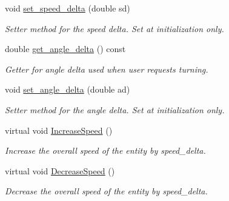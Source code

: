 \begin{DoxyCompactItemize}
void \mbox{\hyperlink{class_motion_handler_a908b330346b3fe969684106bd5c7619d}{set\+\_\+speed\+\_\+delta}} (double sd)
\begin{DoxyCompactList}\small\item\em Setter method for the speed delta. Set at initialization only. \end{DoxyCompactList}\item 
\mbox{\label{class_motion_handler_aa5ec33068c516234a6521de356b08d68}} 
double \mbox{\hyperlink{class_motion_handler_aa5ec33068c516234a6521de356b08d68}{get\+\_\+angle\+\_\+delta}} () const
\begin{DoxyCompactList}\small\item\em Getter for angle delta used when user requests turning. \end{DoxyCompactList}\item 
\mbox{\label{class_motion_handler_a8c2811ddf1a0f077fec829c460009286}} 
void \mbox{\hyperlink{class_motion_handler_a8c2811ddf1a0f077fec829c460009286}{set\+\_\+angle\+\_\+delta}} (double ad)
\begin{DoxyCompactList}\small\item\em Setter method for the angle delta. Set at initialization only. \end{DoxyCompactList}\item 
\mbox{\label{class_motion_handler_af6b91f5626075b09dba3d14177213622}} 
virtual void \mbox{\hyperlink{class_motion_handler_af6b91f5626075b09dba3d14177213622}{Increase\+Speed}} ()
\begin{DoxyCompactList}\small\item\em Increase the overall speed of the entity by speed\+\_\+delta. \end{DoxyCompactList}\item 
\mbox{\label{class_motion_handler_a25ad77fb1a4c79f8303a256b7e1cbc9c}} 
virtual void \mbox{\hyperlink{class_motion_handler_a25ad77fb1a4c79f8303a256b7e1cbc9c}{Decrease\+Speed}} ()
\begin{DoxyCompactList}\small\item\em Decrease the overall speed of the entity by speed\+\_\+delta. \end{DoxyCompactList}\item 
\mbox{\label{class_motion_handler_a22b99a21307a534165d811740d8aeac1}} 

\end{DoxyCompactItemize}

